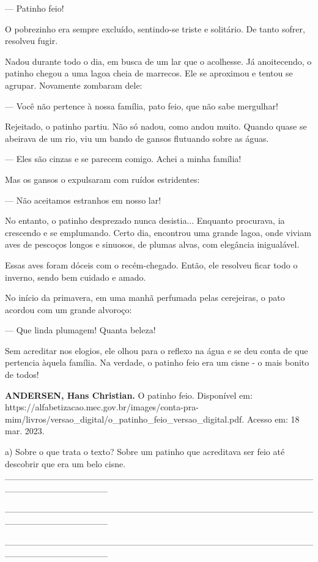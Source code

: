 \begin{itemize}
{{{\begin{itemize}
\begin{itemize}
\begin{itemize}
--- Patinho feio!

O pobrezinho era sempre excluído, sentindo-se triste e solitário. De
tanto sofrer, resolveu fugir.

Nadou durante todo o dia, em busca de um lar que o acolhesse. Já
anoitecendo, o patinho chegou a uma lagoa cheia de marrecos. Ele se
aproximou e tentou se agrupar. Novamente zombaram dele:

--- Você não pertence à nossa família, pato feio, que não sabe
mergulhar!

Rejeitado, o patinho partiu. Não só nadou, como andou muito. Quando
quase se abeirava de um rio, viu um bando de gansos flutuando sobre as
águas.

--- Eles são cinzas e se parecem comigo. Achei a minha família!

Mas os gansos o expulsaram com ruídos estridentes:

--- Não aceitamos estranhos em nosso lar!

No entanto, o patinho desprezado nunca desistia... Enquanto procurava,
ia crescendo e se emplumando. Certo dia, encontrou uma grande lagoa,
onde viviam aves de pescoços longos e sinuosos, de plumas alvas, com
elegância inigualável.

Essas aves foram dóceis com o recém-chegado. Então, ele resolveu ficar
todo o inverno, sendo bem cuidado e amado.

No início da primavera, em uma manhã perfumada pelas cerejeiras, o pato
acordou com um grande alvoroço:

--- Que linda plumagem! Quanta beleza!

Sem acreditar nos elogios, ele olhou para o reflexo na água e se deu
conta de que pertencia àquela família. Na verdade, o patinho feio era um
cisne - o mais bonito de todos!

\textbf{ANDERSEN, Hans Christian.} O patinho feio. Disponível em:
https://alfabetizacao.mec.gov.br/images/conta-pra-mim/livros/versao\_digital/o\_patinho\_feio\_versao\_digital.pdf.
Acesso em: 18 mar. 2023.

a) Sobre o que trata o texto? Sobre um patinho que acreditava ser feio
até descobrir que era um belo cisne.
\_\_\_\_\_\_\_\_\_\_\_\_\_\_\_\_\_\_\_\_\_\_\_\_\_\_\_\_\_\_\_\_\_\_\_\_\_\_\_\_\_\_\_\_\_\_\_\_\_\_\_\_\_\_\_\_\_\_\_\_\_\_\_\_

\_\_\_\_\_\_\_\_\_\_\_\_\_\_\_\_\_\_\_\_\_\_\_\_\_\_\_\_\_\_\_\_\_\_\_\_\_\_\_\_\_\_\_\_\_\_\_\_\_\_\_\_\_\_\_\_\_\_\_\_\_\_\_\_

\_\_\_\_\_\_\_\_\_\_\_\_\_\_\_\_\_\_\_\_\_\_\_\_\_\_\_\_\_\_\_\_\_\_\_\_\_\_\_\_\_\_\_\_\_\_\_\_\_\_\_\_\_\_\_\_\_\_\_\_\_\_\_\_


\end{itemize}
\end{itemize}
\end{itemize}}}}
\end{itemize}
